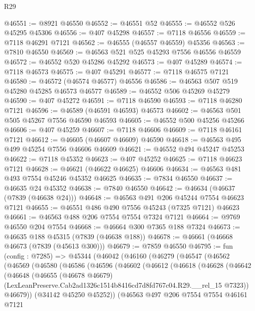 \begin{lexlean}{R29}
\begin{coremodule}
@46551 := @8921 @46550
@46552 := @46551 @52
@46555 := @46552 @526 @45295 @45306
@46556 := @407 @45298
@46557 := @7118 @46556
@46559 := @7118 @46291 @7121
@46562 := @46555 (@46557 @46559) @45356
@46563 := @7810 @46550
@46569 := @46563 @521 @525 @45293 @7556 @46556 @46559
@46572 := @46552 @520 @45286 @45292
@46573 := @407 @45289
@46574 := @7118 @46573
@46575 := @407 @45291
@46577 := @7118 @46575 @7121
@46580 := @46572 (@46574 @46577) @46556
@46586 := @46563 @507 @519 @45280 @45285 @46573 @46577
@46589 := @46552 @506 @45269 @45279
@46590 := @407 @45272
@46591 := @7118 @46590
@46593 := @7118 @46280 @7121
@46596 := @46589 (@46591 @46593) @46573
@46602 := @46563 @501 @505 @45267 @7556 @46590 @46593
@46605 := @46552 @500 @45256 @45266
@46606 := @407 @45259
@46607 := @7118 @46606
@46609 := @7118 @46161 @7121
@46612 := @46605 (@46607 @46609) @46590
@46618 := @46563 @495 @499 @45254 @7556 @46606 @46609
@46621 := @46552 @494 @45247 @45253
@46622 := @7118 @45352
@46623 := @407 @45252
@46625 := @7118 @46623 @7121
@46628 := @46621 (@46622 @46625) @46606
@46634 := @46563 @481 @493 @7554 @45246 @45352 @46625
@46635 := @7834 @46550
@46637 := @46635 @24 @45352
@46638 := @7840 @46550
@46642 := @46634 (@46637 (@7839 (@46638 @24)))
@46648 := @46563 @491 @206 @45244 @7554 @46623 @7121
@46655 := @46551 @486 @490 @7556 @45243 (@7325 @7121) @46623
@46661 := @46563 @488 @206 @7554 @7554 @7324 @7121
@46664 := @9769 @46550 @204 @7554
@46668 := @46664 @300 @7365 @188 @7324
@46673 := @46635 @188 @45315 (@7839 (@46638 @188))
@46678 := @46661 (@46668 @46673 (@7839 (@45613 @300)))
@46679 := @7859 @46550
@46795 := fun (config : @7285) =>
  @45344
    (@46042
      (@46160
        (@46279
          (@46547
            (@46562
              (@46569
                (@46580
                  (@46586
                    (@46596
                      (@46602
                        (@46612
                          (@46618
                            (@46628
                              (@46642
                                (@46648
                                  (@46655
                                    (@46678 @46679)
                                    (LexLeanPreserve.Cab2ad1326c1514b8416cd7d8fd767c04.R29.__rel_15
                                      @7323))
                                  @46679))
                              (@34142 @45250 @45252))
                            (@46563
                              @497
                              @206
                              @7554
                              @7554
                              @46161
                              @7121

\end{coremodule}
\end{lexlean}
